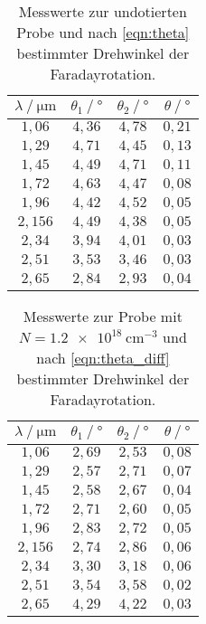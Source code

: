 \begin{table}
              \centering
              \caption{Messwerte zur undotierten Probe und nach \autoref{eqn:theta} bestimmter Drehwinkel der Faradayrotation.}
              \label{tab:mw1}
              \begin{tabular}{c c c c}
                \toprule
                $\lambda \mathbin{/} \unit{\micro\meter}$ & $\theta_{1} \mathbin{/} \unit{\degree}$ & $\theta_{2} \mathbin{/} \unit{\degree}$ &%
                 $\theta \mathbin{/} \unit{\degree}$ \\
                \midrule
                $1,06 $ & $4,36$ & $4,78$ & $0,21$ \\
                $1,29 $ & $4,71$ & $4,45$ & $0,13$ \\
                $1,45 $ & $4,49$ & $4,71$ & $0,11$ \\
                $1,72 $ & $4,63$ & $4,47$ & $0,08$ \\
                $1,96 $ & $4,42$ & $4,52$ & $0,05$ \\
                $2,156$ & $4,49$ & $4,38$ & $0,05$ \\
                $2,34 $ & $3,94$ & $4,01$ & $0,03$ \\
                $2,51 $ & $3,53$ & $3,46$ & $0,03$ \\
                $2,65 $ & $2,84$ & $2,93$ & $0,04$ \\
                \bottomrule
              \end{tabular}
\end{table}

\begin{table}
              \centering
              \caption{Messwerte zur Probe mit $N = \qty{1.2e18}{\centi\metre^{-3}}$ und nach \autoref{eqn:theta_diff} bestimmter Drehwinkel der Faradayrotation.}
              \label{tab:mw2}
              \begin{tabular}{c c c c}
                \toprule
                $\lambda \mathbin{/} \unit{\micro\meter}$ & $\theta_{1} \mathbin{/} \unit{\degree}$ & $\theta_{2} \mathbin{/} \unit{\degree}$ &%
                 $\theta \mathbin{/} \unit{\degree}$ \\
                \midrule
                $1,06 $ & $2,69$ & $2,53$ & $0,08$ \\
                $1,29 $ & $2,57$ & $2,71$ & $0,07$ \\
                $1,45 $ & $2,58$ & $2,67$ & $0,04$ \\
                $1,72 $ & $2,71$ & $2,60$ & $0,05$ \\
                $1,96 $ & $2,83$ & $2,72$ & $0,05$ \\
                $2,156$ & $2,74$ & $2,86$ & $0,06$ \\
                $2,34 $ & $3,30$ & $3,18$ & $0,06$ \\
                $2,51 $ & $3,54$ & $3,58$ & $0,02$ \\
                $2,65 $ & $4,29$ & $4,22$ & $0,03$ \\
                \bottomrule
              \end{tabular}
\end{table}

